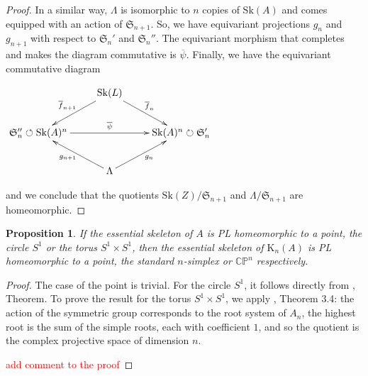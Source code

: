 \documentclass{amsart}%
\numberwithin{equation}{subsection}
\theoremstyle{plain2}
\newtheorem{prop}[equation]{Proposition}
\theoremstyle{definition2}
\theoremstyle{stepstyle}
\theoremstyle{point}
\theoremstyle{subpoint}
\newcommand{\CP}{\ensuremath{\mathbb{CP}}}
\newcommand{\Sk}{\mathrm{Sk}}
\begin{document}
\begin{proof}
In a similar way, $\Lambda$ is isomorphic to $n$ copies of $\Sk(A)$ and comes equipped with an action of $\mathfrak{S}_{n+1}$. So, we have equivariant projections $g_n$ and $g_{n+1}$ with respect to $\mathfrak{S}_n'$ and $\mathfrak{S}_n''$. The equivariant morphism that completes and makes the diagram commutative is $\overline{\psi}$. Finally, we have the equivariant commutative diagram
\begin{center}
\xymatrixrowsep{1pc}
\xymatrixrowsep{1pc}
$\xymatrix{
& \Sk(L)  \ar[ld]_{\overline{f}_{n+1}} \ar[rd]^{\overline{f}_{n}}  &\\
\mathfrak{S}_n'' \circlearrowleft\Sk(A)^n  \ar[rr]^{\overline{\psi}}& & \Sk(A)^n\circlearrowright \mathfrak{S}_n' \\
& \Lambda\ar[lu]^{g_{n+1}}\ar[ru]_{g_n} &
}$
\end{center} and we conclude that the quotients $\Sk(Z)/\mathfrak{S}_{n+1}$ and $\Lambda/\mathfrak{S}_{n+1}$ are homeomorphic.
\end{proof}

\begin{prop} \label{prop top essential skeleton Kummer}
If the essential skeleton of $A$ is PL homeomorphic to a point, the circle $S^1$ or the torus $S^1 \times S^1$, then the essential skeleton of $\text{K}_n(A)$ is PL homeomorphic to a point, the standard $n$-simplex or $\CP^n$ respectively. 
\end{prop}
\begin{proof}
The case of the point is trivial. For the circle $S^1$, it follows directly from \cite{Morton}, Theorem. To prove the result for the torus $S^1 \times S^1$, we apply \cite{Looijenga}, Theorem 3.4: the action of the symmetric group corresponds to the root system of $A_n$, the highest root is the sum of the simple roots, each with coefficient $1$, and so the quotient is the complex projective space of dimension $n$.

\textcolor{red}{add comment to the proof}
\end{proof}
\end{document}
